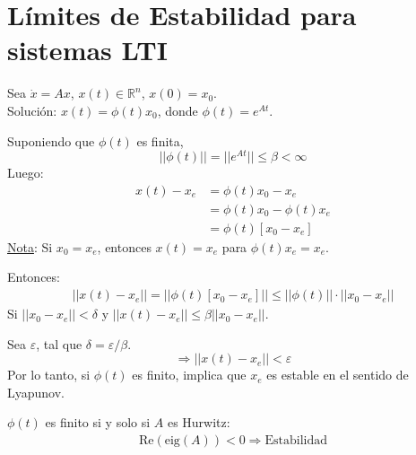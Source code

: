 \section{Límites de Estabilidad para sistemas LTI}
Sea $\dot{x}=Ax$, $x(t)\in \mathbb{R}^n$, $x(0)=x_0$.\\
Solución: $x(t)=\phi(t)x_0$, donde $\phi(t)=e^{At}$.\\
\par Suponiendo que $\phi(t)$ es finita,
$$||\phi(t)||=||e^{At}||\leq\beta<\infty $$
Luego:
\begin{align*}
    x(t)-x_e &= \phi(t)x_0-x_e\\
    &= \phi(t)x_0-\phi(t)x_e\\
    &= \phi(t)[x_0-x_e]
\end{align*}
\underline{Nota}: Si $x_0=x_e$, entonces $x(t)=x_e$ para $\phi(t)x_e=x_e$.\\
\par Entonces:
\begin{align*}
    ||x(t)-x_e||=||\phi(t)[x_0-x_e]||\leq||\phi(t)||\cdot||x_0-x_e||
\end{align*}
Si $||x_0-x_e||<\delta$ y $||x(t)-x_e||\leq \beta||x_0-x_e||$.\\
\par Sea $\varepsilon$, tal que $\delta=\varepsilon/\beta$.
$$\Longrightarrow ||x(t)-x_e||<\varepsilon $$
Por lo tanto, si $\phi(t)$ es finito, implica que $x_e$ es estable en el sentido de Lyapunov.\\
\par $\phi(t)$ es finito si y solo si $A$ es Hurwitz:
\begin{align*}
    \text{Re}\left(\text{eig}(A)\right)<0\Longrightarrow \text{Estabilidad}
\end{align*}

